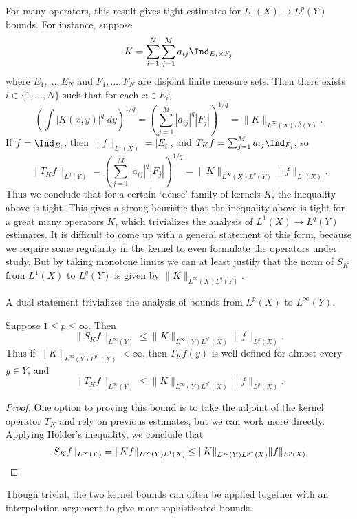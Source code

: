 \begin{remark}
    For many operators, this result gives tight estimates for $L^1(X) \to L^p(Y)$ bounds. For instance, suppose
  \[ K = \sum_{i = 1}^N \sum_{j = 1}^M a_{ij} \Ind_{E_i \times F_j} \]
  where $E_1,\dots,E_N$ and $F_1,\dots,F_N$ are disjoint finite measure sets. Then there exists $i \in \{ 1, \dots, N \}$ such that for each $x \in E_i$,
  \[ \left( \int |K(x,y)|^q\; dy \right)^{1/q} = \left( \sum_{j = 1}^M |a_{ij}|^q |F_j| \right)^{1/q} = \| K \|_{L^\infty(X) L^q(Y)}. \]
  If $f = \Ind_{E_i}$, then $\| f \|_{L^1(X)} = |E_i|$, and $T_K f = \sum_{j = 1}^M a_{ij} \Ind_{F_j}$, so
  \[ \| T_K f \|_{L^q(Y)} = \left( \sum_{j = 1}^M |a_{ij}|^q |F_j| \right)^{1/q} = \| K \|_{L^\infty(X) L^q(Y)} \| f \|_{L^1(X)}. \]
  Thus we conclude that for a certain `dense' family of kernels $K$, the inequality above is tight. This gives a strong heuristic that the inequality above is tight for a great many operators $K$, which trivializes the analysis of $L^1(X) \to L^q(Y)$ estimates. It is difficult to come up with a general statement of this form, because we require some regularity in the kernel to even formulate the operators under study. But by taking monotone limits we can at least justify that the norm of $S_K$ from $L^1(X)$ to $L^q(Y)$ is given by $\| K \|_{L^\infty(X) L^q(Y)}$.
\end{remark}

A dual statement trivializes the analysis of bounds from $L^p(X)$ to $L^\infty(Y)$.

\begin{theorem}
  Suppose $1 \leq p \leq \infty$. Then
  \[ \| S_K f \|_{L^\infty(Y)} \leq \| K \|_{L^\infty(Y) L^{p^*}(X)} \| f \|_{L^p(X)}. \]
  Thus if $\| K \|_{L^\infty(Y) L^{p^*}(X)} < \infty$, then $T_K f(y)$ is well defined for almost every $y \in Y$, and
  \[ \| T_K f \|_{L^\infty(Y)} \leq \| K \|_{L^\infty(Y) L^{p^*}(X)} \| f \|_{L^p(X)}. \]
\end{theorem}
\begin{proof}
  One option to proving this bound is to take the adjoint of the kernel operator $T_K$ and rely on previous estimates, but we can work more directly. Applying H\"{o}lder's inequality, we conclude that
  \[ \| S_K f \|_{L^\infty(Y)} = \| K f \|_{L^\infty(Y) L^1(X)} \leq \| K \|_{L^\infty(Y) L^{p^*}(X)} \| f \|_{L^p(X)}. \qedhere \]
\end{proof}

Though trivial, the two kernel bounds can often be applied together with an interpolation argument to give more sophisticated bounds.

